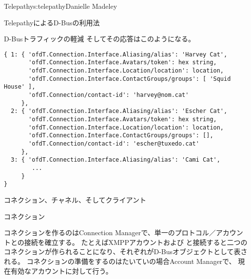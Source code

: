 \begin{aosachapter}{Telepathy}{s:telepathy}{Danielle Madeley}
\begin{aosasect1}{TelepathyによるD-Busの利用法}
\begin{aosasect2}{D-Busトラフィックの軽減}
\noindent
そしてその応答はこのようになる。

\begin{verbatim}
{ 1: { 'ofdT.Connection.Interface.Aliasing/alias': 'Harvey Cat',
       'ofdT.Connection.Interface.Avatars/token': hex string,
       'ofdT.Connection.Interface.Location/location': location,
       'ofdT.Connection.Interface.ContactGroups/groups': [ 'Squid House' ],
       'ofdT.Connection/contact-id': 'harvey@nom.cat'
     },
  2: { 'ofdT.Connection.Interface.Aliasing/alias': 'Escher Cat',
       'ofdT.Connection.Interface.Avatars/token': hex string,
       'ofdT.Connection.Interface.Location/location': location,
       'ofdT.Connection.Interface.ContactGroups/groups': [],
       'ofdT.Connection/contact-id': 'escher@tuxedo.cat'
     },
  3: { 'ofdT.Connection.Interface.Aliasing/alias': 'Cami Cat',
        ...
     }
}
\end{verbatim}

\end{aosasect2}

\end{aosasect1}

\begin{aosasect1}{コネクション、チャネル、そしてクライアント}
\label{sec.telepathy.ccc}

\begin{aosasect2}{コネクション}

コネクションを作るのはConnection Managerで、単一のプロトコル／アカウントとの接続を確立する。
たとえばXMPPアカウントおよび
と接続すると二つのコネクションが作られることになり、それぞれがD-Busオブジェクトとして表される。
コネクションの準備をするのはたいていの場合Account Managerで、
現在有効なアカウントに対して行う。


\end{aosasect2}
\end{aosasect1}
\end{aosachapter}
